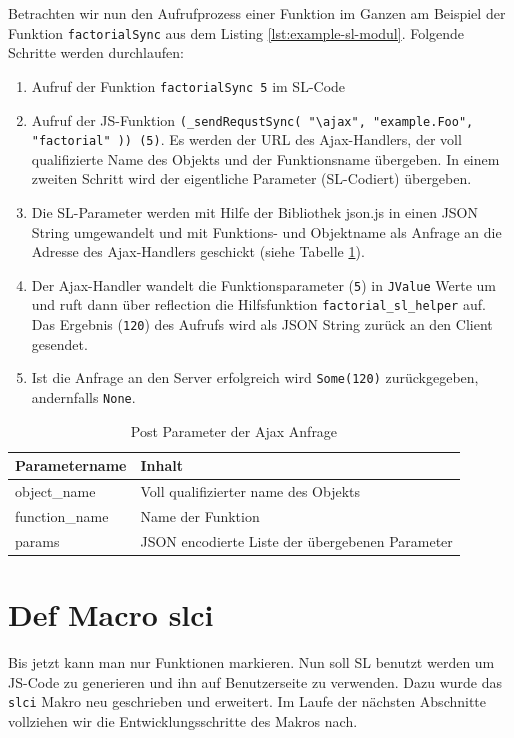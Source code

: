 \documentclass[12pt,bibtotoc]{scrreprt}
\begin{document}
Betrachten wir nun den Aufrufprozess einer Funktion im Ganzen am Beispiel der Funktion \lstinline!factorialSync! aus dem Listing \ref{lst:example-sl-modul}. Folgende Schritte werden durchlaufen:
\begin{enumerate}
 \item{Aufruf der Funktion \lstinline!factorialSync 5! im \ac{SL}-Code}
 \item{Aufruf der \ac{JS}-Funktion \lstinline!(_sendRequstSync( "\ajax", "example.Foo", "factorial" )) (5)!. Es werden der \ac{URL} des Ajax-Handlers, der voll qualifizierte Name des Objekts und der Funktionsname übergeben. In einem zweiten Schritt wird der eigentliche Parameter (\ac{SL}-Codiert) übergeben.}
 \item{Die \ac{SL}-Parameter werden mit Hilfe der Bibliothek json.js \cite{Crockford2010} in einen JSON String umgewandelt und mit Funktions- und Objektname als Anfrage an die Adresse des Ajax-Handlers geschickt (siehe Tabelle \ref{tab:post-parameter}).}
 \item{Der Ajax-Handler wandelt die Funktionsparameter (\lstinline!5!) in \lstinline!JValue! Werte um \cite{Json4s} und ruft dann über reflection die Hilfsfunktion \lstinline!factorial_sl_helper! auf. Das Ergebnis (\lstinline!120!) des Aufrufs wird als JSON String zurück an den Client gesendet.}
 \item{Ist die Anfrage an den Server erfolgreich wird \lstinline!Some(120)! zurückgegeben, andernfalls \lstinline!None!.}
\end{enumerate}

\begin{table}[h]
\caption{Post Parameter der Ajax Anfrage}
\centering
\begin{tabular}{ll}
Parametername        &   Inhalt \\
\hline
object\_name   & Voll qualifizierter name des Objekts \\
function\_name & Name der Funktion\\
params         & JSON encodierte Liste der übergebenen Parameter\\
\end{tabular}
\label{tab:post-parameter}
\end{table}

\section{Def Macro slci}
\label{sec:inline-macro}

Bis jetzt kann man nur Funktionen markieren. Nun soll \ac{SL} benutzt werden um \ac{JS}-Code zu generieren und ihn auf Benutzerseite zu verwenden. Dazu wurde das \lstinline!slci! Makro neu geschrieben und erweitert. Im Laufe der nächsten Abschnitte vollziehen wir die Entwicklungsschritte des Makros nach.
\end{document}
